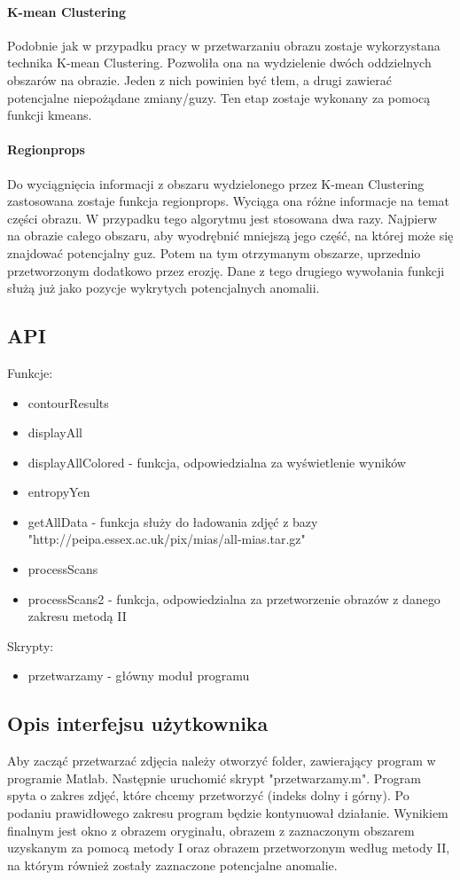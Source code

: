 \documentclass[11pt,openany]{sprawozdanie-agh}
\begin{document}
\paragraph{K-mean Clustering}
Podobnie jak w przypadku pracy \cite{Mohapatra:2011:ALD:1947940.1947980} w przetwarzaniu obrazu zostaje wykorzystana technika K-mean Clustering. Pozwoliła ona na wydzielenie dwóch oddzielnych obszarów na obrazie. Jeden z nich powinien być tłem, a drugi zawierać potencjalne niepożądane zmiany/guzy. Ten etap zostaje wykonany za pomocą funkcji kmeans.

\paragraph{Regionprops}
Do wyciągnięcia informacji z obszaru wydzielonego przez K-mean Clustering zastosowana zostaje funkcja regionprops. Wyciąga ona różne informacje na temat części obrazu. W przypadku tego algorytmu jest stosowana dwa razy. Najpierw na obrazie całego obszaru, aby wyodrębnić mniejszą jego część, na której może się znajdować potencjalny guz. Potem na tym otrzymanym obszarze, uprzednio przetworzonym dodatkowo przez erozję. Dane z tego drugiego wywołania funkcji służą już jako pozycje wykrytych potencjalnych anomalii.


\subsection{API}
Funkcje:
\begin{itemize}
\item contourResults
\item displayAll
\item displayAllColored - funkcja, odpowiedzialna za wyświetlenie wyników
\item entropyYen
\item getAllData - funkcja służy do ładowania zdjęć z bazy "http://peipa.essex.ac.uk/pix/mias/all-mias.tar.gz"
\item processScans
\item processScans2 - funkcja, odpowiedzialna za przetworzenie obrazów z danego zakresu metodą II
\end{itemize}
Skrypty:
\begin{itemize}
\item przetwarzamy - główny moduł programu
\end{itemize}

\subsection{Opis interfejsu użytkownika}
Aby zacząć przetwarzać zdjęcia należy otworzyć folder, zawierający program w programie Matlab. Następnie uruchomić skrypt "przetwarzamy.m". Program spyta o zakres zdjęć, które chcemy przetworzyć (indeks dolny i górny). Po podaniu prawidłowego zakresu program będzie kontynuował działanie. Wynikiem finalnym jest okno z obrazem oryginału, obrazem z zaznaczonym obszarem uzyskanym za pomocą metody I oraz obrazem przetworzonym według metody II, na którym również zostały zaznaczone potencjalne anomalie.



\end{document}
